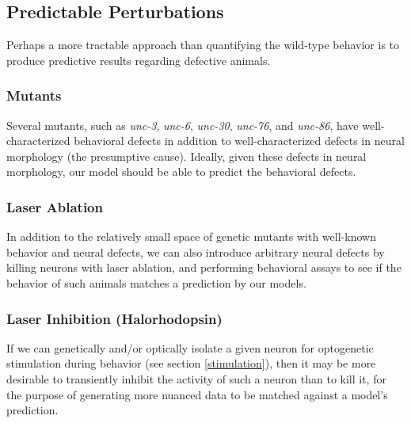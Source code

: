\documentclass[letter,11pt]{article}
\begin{document}
\subsection{Predictable Perturbations}

Perhaps a more tractable approach than quantifying the wild-type behavior is to produce predictive results regarding defective animals.

\subsubsection{Mutants}

Several mutants, such as {\em unc-3}, {\em unc-6}, {\em unc-30}, {\em unc-76}, and {\em unc-86}, have well-characterized behavioral defects
in addition to well-characterized defects in neural morphology (the presumptive cause). Ideally, given these defects in neural morphology,
our model should be able to predict the behavioral defects.

\subsubsection{Laser Ablation}

In addition to the relatively small space of genetic mutants with well-known behavior and neural defects, we can also introduce arbitrary
neural defects by killing neurons with laser ablation, and performing behavioral assays to see if the behavior of such animals matches a
prediction by our models.

\subsubsection{Laser Inhibition (Halorhodopsin)}

If we can genetically and/or optically isolate a given neuron for optogenetic
stimulation during behavior (see section \ref{stimulation}), then it may be
more desirable to transiently inhibit the activity of such a neuron than to
kill it, for the purpose of generating more nuanced data to be matched against
a model's prediction.
\end{document}
